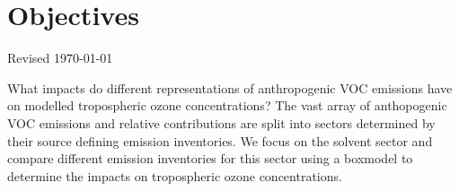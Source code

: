 \documentclass[12pt]{extarticle}
\begin{document}
\vspace{5mm}
\begin{center}
     \par
\end{center}
\vspace{5mm}

\section*{Objectives}
Revised \today \vspace{1cm}

What impacts do different representations of anthropogenic VOC emissions have on modelled tropospheric ozone concentrations?
The vast array of anthopogenic VOC emissions and relative contributions are split into sectors determined by their source defining emission inventories.
We focus on the solvent sector and compare different emission inventories for this sector using a boxmodel to determine the impacts on tropospheric ozone concentrations.
\end{document}
